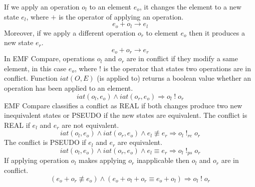 If we apply an operation $o_{l}$ to an element $e_{o}$, it changes the element to a new state $e_{l}$, where $+$ is the operator of applying an operation.
\begin{equation} \label{eq:conflict_1.1}
e_{o} + o_{l}  \rightarrow e_{l}
\end{equation}
Moreover, if we apply a different operation $o_{r}$ to element $e_{o}$ then it produces a new state $e_{r}$. 
\begin{equation} \label{eq:conflict_1.2}
e_{o} + o_{r}  \rightarrow e_{r}
\end{equation}
In EMF Compare, operations $o_{l}$ and $o_{r}$ are in conflict if they modify a same element, in this case $e_{o}$, where $!$ is the operator that states two operations are in conflict. Function $iat(O, E)$ (is applied to) returns a boolean value whether an operation has been applied to an element.
\begin{equation} \label{eq:conflict_1.3}
iat(o_{l}, e_{o}) \wedge iat(o_{r}, e_{o}) \Rightarrow o_{l}\;!\;o_{r}
\end{equation} 
EMF Compare classifies a conflict as \textsf{REAL} if both changes produce two new inequivalent states or \textsf{PSEUDO} if the new states are equivalent.
The conflict is \textsf{REAL} if $e_{l}$ and $e_{r}$ are not equivalent. 
\begin{equation} \label{eq:conflict_1.4}
iat(o_{l}, e_{o}) \wedge iat(o_{r}, e_{o}) \wedge e_{l} \not\equiv e_{r} \Rightarrow o_{l}\;!_{re}\;o_{r}
\end{equation}
The conflict is \textsf{PSEUDO} if $e_{l}$ and $e_{r}$ are equivalent.
\begin{equation} \label{eq:conflict_1.5}
iat(o_{l}, e_{o}) \wedge iat(o_{r}, e_{o}) \wedge e_{l} \equiv e_{r} \Rightarrow o_{l}\;!_{ps}\;o_{r}
\end{equation} 
If applying operation $o_{l}$ makes applying $o_{r}$ inapplicable then $o_{l}$ and $o_{r}$ are in conflict.
\begin{equation} \label{eq:conflict_1.6}
(e_{o} + o_{r} \not\equiv e_{o}) \wedge (e_{o} + o_{l} + o_{r} \equiv e_{o} + o_{l}) \Rightarrow o_{l}\;!\;o_{r}
\end{equation} 

